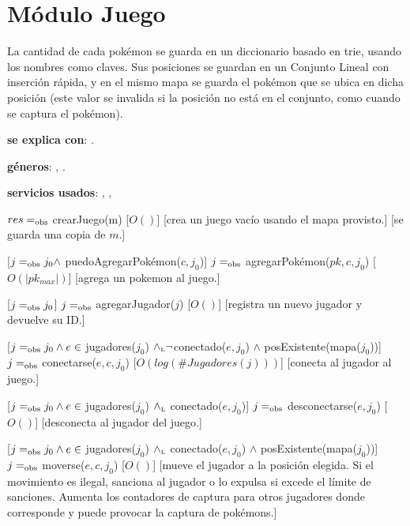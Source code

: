\section{Módulo Juego}

La cantidad de cada pokémon se guarda en un diccionario basado en trie, usando los nombres como claves. Sus posiciones se guardan en un Conjunto Lineal con inserción rápida, y en el mismo mapa se guarda el pokémon que se ubica en dicha posición (este valor se invalida si la posición no está en el conjunto, como cuando se captura el pokémon). 

\begin{Interfaz}

	\textbf{se explica con}: .

	\textbf{géneros}: , .

	\textbf{servicios usados}: , , 


	{$res =_{\mathrm{obs}}$ crearJuego(m)}
	[$O()$]
	[crea un juego vacío usando el mapa provisto.]
	[se guarda una copia de $m$.]

	[$j =_{\mathrm{obs}} j_0 \land$ puedoAgregarPokémon($c,j_0$)]
	{$j =_{\mathrm{obs}}$ agregarPokémon($pk, c, j_0$)}
	[$O(|pk_{max}|)$]
	[agrega un pokemon al juego.]

	[$j =_{\mathrm{obs}} j_0$]
	{$j =_{\mathrm{obs}}$ agregarJugador($j$)}
	[$O()$]
	[registra un nuevo jugador y devuelve su ID.]

	[$j =_{\mathrm{obs}} j_0 \land e \in$ jugadores($j_0$) $\land_{\mathrm{\scriptscriptstyle{L}}} \neg$conectado($e,j_0$) $\land$ posExistente(mapa($j_0$))]
	{$j =_{\mathrm{obs}}$ conectarse($e, c, j_0$)}
	[$O(log(\#Jugadores(j)))$]
	[conecta al jugador al juego.]

	[$j =_{\mathrm{obs}} j_0 \land e \in$ jugadores($j_0$) $\land_{\mathrm{\scriptscriptstyle{L}}}$ conectado($e,j_0$)]
	{$j =_{\mathrm{obs}}$ desconectarse($e, j_0$)}
	[$O()$]
	[desconecta al jugador del juego.]

	[$j =_{\mathrm{obs}} j_0 \land e \in$ jugadores($j_0$) $\land_{\mathrm{\scriptscriptstyle{L}}}$ conectado($e,j_0$) $\land$ posExistente(mapa($j_0$))]
	{$j =_{\mathrm{obs}}$ moverse($e, c, j_0$)}
	[$O()$]
	[mueve el jugador a la posición elegida. Si el movimiento es ilegal, sanciona al jugador o lo expulsa si excede el límite de sanciones. Aumenta los contadores de captura para otros jugadores donde corresponde y puede provocar la captura de pokémons.]


\end{Interfaz}
